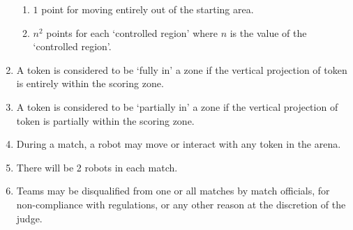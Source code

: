 \begin{enumerate}
\begin{enumerate}
      \item $1$ point for moving entirely out of the starting area.
      \item $n^2$ points for each `controlled region' where $n$ is the value of the `controlled region'.
    \end{enumerate}
  \item A token is considered to be `fully in' a zone if the vertical projection of token
        is entirely within the scoring zone.
  \item A token is considered to be `partially in' a zone if the vertical projection of token
        is partially within the scoring zone.
  \item During a match, a robot may move or interact with any token in the arena.
  \item There will be 2 robots in each match.
  \item Teams may be disqualified from one or all matches by match officials,
        for non-compliance with regulations, or any other reason at the
        discretion of the judge.
\end{enumerate}
